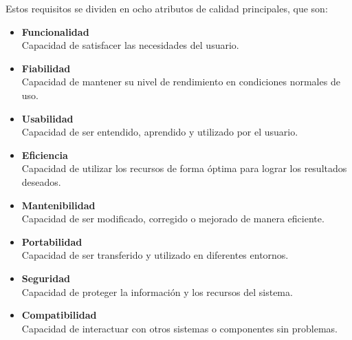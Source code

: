 Estos requisitos se dividen en ocho atributos de calidad principales, que son:
\begin{itemize}
  \item \textbf{Funcionalidad} \\
  Capacidad de satisfacer las necesidades del usuario.
  \item \textbf{Fiabilidad} \\
  Capacidad de mantener su nivel de rendimiento en condiciones normales de uso.
  \item \textbf{Usabilidad} \\
  Capacidad de ser entendido, aprendido y utilizado por el usuario.
  \item \textbf{Eficiencia} \\
  Capacidad de utilizar los recursos de forma óptima para lograr los resultados deseados.
  \item \textbf{Mantenibilidad} \\
  Capacidad de ser modificado, corregido o mejorado de manera eficiente.
  \item \textbf{Portabilidad} \\
  Capacidad de ser transferido y utilizado en diferentes entornos.
  \item \textbf{Seguridad} \\
  Capacidad de proteger la información y los recursos del sistema.
  \item \textbf{Compatibilidad} \\
  Capacidad de interactuar con otros sistemas o componentes sin problemas.
\end{itemize}